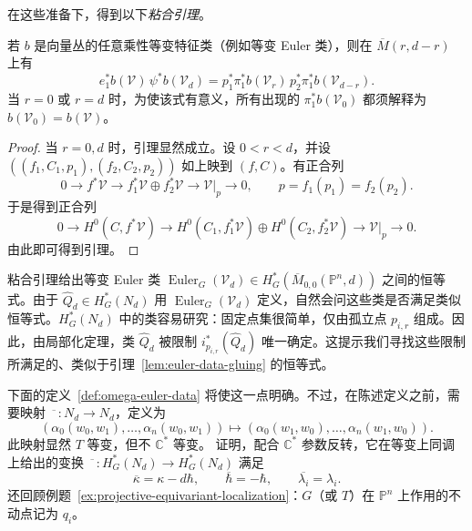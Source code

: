在这些准备下，得到以下\emph{粘合引理}。
\begin{lemma}\label{lem:euler-data-gluing}
若 $b$ 是向量丛的任意乘性等变特征类（例如等变 Euler 类），则在 $\overline M(r,d-r)$ 上有
\[
e_1^*b(\mathcal V)\,\psi^*b(\mathcal V_d)
=p_1^*\pi_1^*b(\mathcal V_r)\,p_2^*\pi_1^*b(\mathcal V_{d-r}).
\]
当 $r=0$ 或 $r=d$ 时，为使该式有意义，所有出现的 $\pi_1^*b(\mathcal V_0)$ 都须解释为 $b(\mathcal V_0)=b(\mathcal V)$。
\end{lemma}
\begin{proof}
当 $r=0,d$ 时，引理显然成立。设 $0<r<d$，并设 $((f_1,C_1,p_1),\allowbreak(f_2,C_2,p_2))$ 如上映到 $(f,C)$。有正合列
\[
0\longrightarrow f^*\mathcal V\longrightarrow
f_1^*\mathcal V\oplus f_2^*\mathcal V\longrightarrow\mathcal V|_p\longrightarrow0,
\qquad p=f_1(p_1)=f_2(p_2).
\]
于是得到正合列
\[
0\longrightarrow H^0(C,f^*\mathcal V)\longrightarrow
H^0(C_1,f_1^*\mathcal V)\oplus H^0(C_2,f_2^*\mathcal V)
\longrightarrow\mathcal V|_p\longrightarrow0.
\]
由此即可得到引理。
\end{proof}

粘合引理给出等变 Euler 类 $\operatorname{Euler}_G(\mathcal V_d)\in H_G^*(\overline M_{0,0}(\mathbb P^n,d))$ 之间的恒等式。由于 $\widehat Q_d\in H_G^*(N_d)$ 用 $\operatorname{Euler}_G(\mathcal V_d)$ 定义，自然会问这些类是否满足类似恒等式。$H_G^*(N_d)$ 中的类容易研究：固定点集很简单，仅由孤立点 $p_{i,r}$ 组成。因此，由局部化定理，类 $\widehat Q_d$ 被限制 $i_{p_{i,r}}^*(\widehat Q_d)$ 唯一确定。这提示我们寻找这些限制所满足的、类似于引理~\ref{lem:euler-data-gluing} 的恒等式。

下面的定义~\ref{def:omega-euler-data} 将使这一点明确。不过，在陈述定义之前，需要映射 $\overline{\phantom\alpha}:N_d\to N_d$，定义为
\[
(\alpha_0(w_0,w_1),\ldots,\alpha_n(w_0,w_1))
\longmapsto(\alpha_0(w_1,w_0),\ldots,\alpha_n(w_1,w_0)).
\]
此映射显然 $T$ 等变，但不 $\mathbb C^*$ 等变。 证明，配合 $\mathbb C^*$ 参数反转，它在等变上同调上给出的变换 $\overline{\phantom\alpha}:H_G^*(N_d)\to H_G^*(N_d)$ 满足
\begin{equation}\label{eq:euler-data-involution}
\overline\kappa=\kappa-d\hbar,\qquad\overline\hbar=-\hbar,
\qquad\overline{\lambda_i}=\lambda_i.
\end{equation}
还回顾例题~\ref{ex:projective-equivariant-localization}：$G$（或 $T$）在 $\mathbb P^n$ 上作用的不动点记为 $q_i$。

